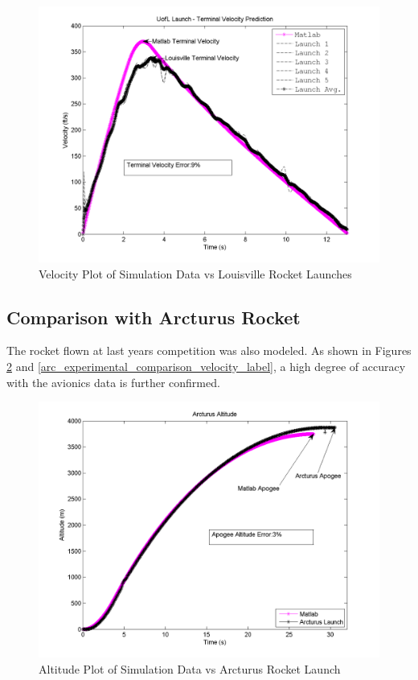 \documentclass[]{book}
\begin{document}
\begin{figure}[htbp]
\centering
\includegraphics{images/plots/plot_louisville_velocity_analysis.png}
\caption{Velocity Plot of Simulation Data vs Louisville Rocket Launches
\label{experimental_comparison_velocity_label}}
\end{figure}

\clearpage 

\subsection{Comparison with Arcturus
Rocket}\label{comparison-with-arcturus-rocket}

The rocket flown at last years competition was also modeled. As shown in
Figures \ref{arc_experimental_comparison_altitude_label} and
\ref{arc_experimental_comparison_velocity_label}, a high degree of
accuracy with the avionics data is further confirmed.

\begin{figure}[htbp]
\centering
\includegraphics{images/plots/plot_arcturus_altitude_analysis.png}
\caption{Altitude Plot of Simulation Data vs Arcturus Rocket Launch
\label{arc_experimental_comparison_altitude_label}}
\end{figure}
\end{document}
